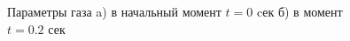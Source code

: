 \documentclass[a4paper,12pt]{extarticle}
\begin{document}
\begin{figure}[h]
\begin{minipage}[h]{0.49\linewidth}
\end{minipage}
\caption{Параметры газа a) в начальный момент $t=0$ cек б) в момент $t=0.2$ сек}
\label{fig:Sod 2 moments}
\end{figure}

\end{document}
